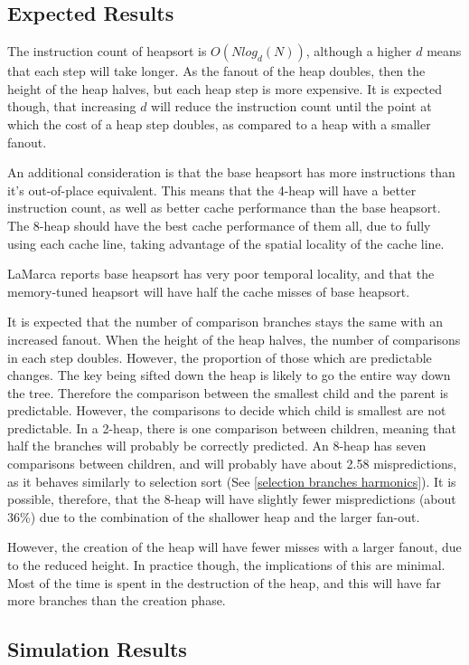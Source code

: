 \subsection{Expected Results}
The instruction count of heapsort is $O(Nlog_d(N))$, although a higher $d$ means
that each step will take longer. As the fanout of the heap doubles, then the
height of the heap halves, but each heap step is more expensive. It is expected
though, that increasing $d$ will reduce the instruction count until the point at
which the cost of a heap step doubles, as compared to a heap with a smaller
fanout.

An additional consideration is that the base heapsort has more instructions than
it's out-of-place equivalent. This means that the 4-heap will have a better
instruction count, as well as better cache performance than the base heapsort.
The 8-heap should have the best cache performance of them all, due to fully
using each cache line, taking advantage of the spatial locality of the cache
line.

LaMarca reports base heapsort has very poor temporal locality, and that the
memory-tuned heapsort will have half the cache misses of base heapsort.

It is expected that the number of comparison branches stays the same with
an increased fanout. When the height of the heap halves, the number of
comparisons in each step doubles. However, the proportion of those which are
predictable changes. The key being sifted down the heap is likely to go the
entire way down the tree. Therefore the comparison between the smallest child
and the parent is predictable. However, the comparisons to decide which child is
smallest are not predictable. In a 2-heap, there is one comparison between
children, meaning that half the branches will probably be correctly predicted.
An 8-heap has seven comparisons between children, and will probably have about
2.58 mispredictions, as it behaves similarly to selection sort (See \ref{selection
branches harmonics}). It is possible, therefore, that the 8-heap will have slightly
fewer mispredictions (about 36\%) due to the combination of the shallower heap
and the larger fan-out.

However, the creation of the heap will have fewer misses with a larger fanout,
due to the reduced height. In practice though, the implications of this are
minimal. Most of the time is spent in the destruction of the heap, and this will
have far more branches than the creation phase.

\subsection{Simulation Results}

